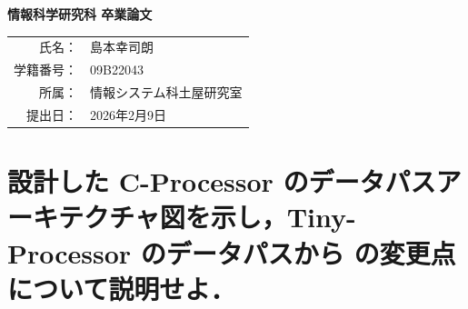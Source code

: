 \documentclass[a4paper,10pt]{jarticle}
\begin{document}
\thispagestyle{empty}



\begin{center}

\vspace*{50mm}
\textbf{\Huge{情報科学研究科 卒業論文}}\\
\vspace*{60mm}
\Large{
\begin{tabular}{rl}
氏名：&島本幸司朗\\
学籍番号：&09B22043\\
所属：&情報システム科土屋研究室\\
提出日：&2026年2月9日\\
\end{tabular}
}
\end{center}
\newpage


\section{設計した C-Processor のデータパスアーキテクチャ図を示し，Tiny-Processor のデータパスから
の変更点について説明せよ．}
\end{document}
